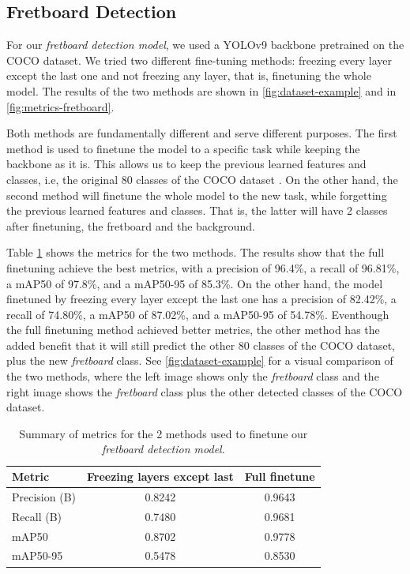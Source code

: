 \documentclass[10pt,twocolumn,letterpaper]{article}
\begin{document}
\subsection{Fretboard Detection}
For our \emph{fretboard detection model}, we used a YOLOv9 backbone \cite{wang2024yolov9} pretrained on the COCO dataset. We tried two different fine-tuning methods: freezing every layer except the last one and not freezing any layer, that is, finetuning the whole model. The results of the two methods are shown in \cref{fig:dataset-example} and in \cref{fig:metrics-fretboard}. 

Both methods are fundamentally different and serve different purposes. The first method is used to finetune the model to a specific task while keeping the backbone as it is. This allows us to keep the previous learned features and classes, i.e, the original 80 classes of the COCO dataset \cite{lin2015microsoftcococommonobjects}. On the other hand, the second method will finetune the whole model to the new task, while forgetting the previous learned features and classes. That is, the latter will have 2 classes after finetuning, the fretboard and the background.

Table \ref{tab:fretboard-metrics} shows the metrics for the two methods. The results show that the full finetuning achieve the best metrics, with a precision of 96.4\%, a recall of 96.81\%, a mAP50 of 97.8\%, and a mAP50-95 of 85.3\%. On the other hand, the model finetuned by freezing every layer except the last one has a precision of 82.42\%, a recall of 74.80\%, a mAP50 of 87.02\%, and a mAP50-95 of 54.78\%. Eventhough the full finetuning method achieved better metrics, the other method has the added benefit that it will still predict the other 80 classes of the COCO dataset, plus the new \emph{fretboard} class. See \cref{fig:dataset-example} for a visual comparison of the two methods, where the left image shows only the \emph{fretboard} class and the right image shows the \emph{fretboard} class plus the other detected classes of the COCO dataset.

\begin{table}[h!]
    \centering
    \caption{Summary of metrics for the 2 methods used to finetune our \emph{fretboard detection model}.}
    \begin{tabular}{lcc}
        \toprule
        \textbf{Metric} & \textbf{Freezing layers except last} & \textbf{Full finetune} \\
        \midrule
        Precision (B)   & 0.8242 & 0.9643 \\
        Recall (B)      & 0.7480 & 0.9681 \\
        mAP50           & 0.8702 & 0.9778 \\
        mAP50-95        & 0.5478 & 0.8530 \\
        \bottomrule
    \end{tabular}
    \label{tab:fretboard-metrics}
\end{table}
\end{document}
